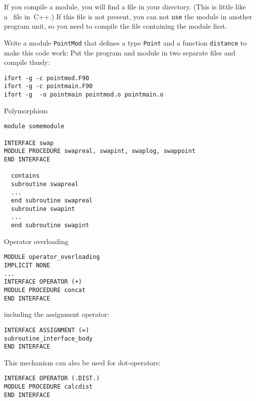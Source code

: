 If you compile a module, you will find a  file in your
directory. (This is little like a~ file in~C++.)
If this file is not present, you can not \lstinline{use} the module in another
program unit, so you need to compile the file containing the module
first.

\begin{exercise}
  \label{ex:fpointmod}
  Write a module \lstinline{PointMod} that defines a type \lstinline{Point} and a
  function \lstinline{distance} to make this code work:
  Put the program and module in two separate files and compile thusly:
\begin{lstlisting}
ifort -g -c pointmod.F90
ifort -g -c pointmain.F90
ifort -g  -o pointmain pointmod.o pointmain.o 
\end{lstlisting}
\end{exercise}

 {Polymorphism}

\begin{lstlisting}
module somemodule

INTERFACE swap
MODULE PROCEDURE swapreal, swapint, swaplog, swappoint
END INTERFACE

  contains
  subroutine swapreal
  ...
  end subroutine swapreal
  subroutine swapint
  ...
  end subroutine swapint
\end{lstlisting}

 {Operator overloading}

\begin{lstlisting}
MODULE operator_overloading
IMPLICIT NONE
...
INTERFACE OPERATOR (+)
MODULE PROCEDURE concat
END INTERFACE
\end{lstlisting}

including the assignment operator:

\begin{lstlisting}
INTERFACE ASSIGNMENT (=) 
subroutine_interface_body
END INTERFACE
\end{lstlisting}

This mechanism can also be used for dot-operators:

\begin{lstlisting}
INTERFACE OPERATOR (.DIST.)
MODULE PROCEDURE calcdist
END INTERFACE
\end{lstlisting}

